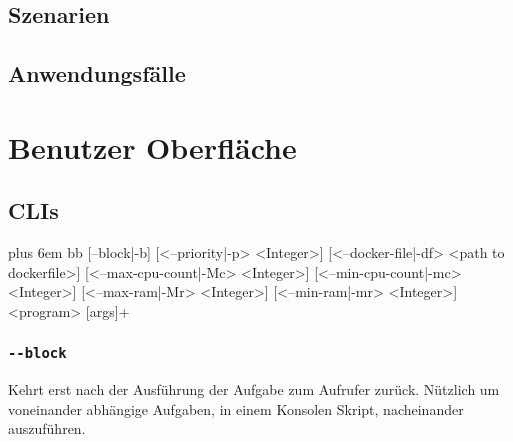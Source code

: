 \documentclass[parskip=full]{scrartcl}
\makeatletter
\newenvironment{mycode}
 {\def\@xobeysp{\ }\verbatim\rightskip=0pt plus 6em\relax}
 {\endverbatim}
\makeatother
\begin{document}
\subsection{Szenarien}

\subsection{Anwendungsfälle}

\section{Benutzer Oberfläche}
\subsection{\glspl{CLI}}
\begin{mycode}
bb [--block|-b] [<--priority|-p> <Integer>] [<--docker-file|-df> <path to dockerfile>] [<--max-cpu-count|-Mc> <Integer>] [<--min-cpu-count|-mc> <Integer>] [<--max-ram|-Mr> <Integer>] [<--min-ram|-mr> <Integer>] <program> [args]+
\end{mycode}

\subsubsection{\texttt{-{}-block}}
Kehrt erst nach der Ausführung der Aufgabe zum Aufrufer zurück. Nützlich um voneinander abhängige Aufgaben, in einem Konsolen Skript, nacheinander auszuführen.

\printnoidxglossaries
\end{document}
